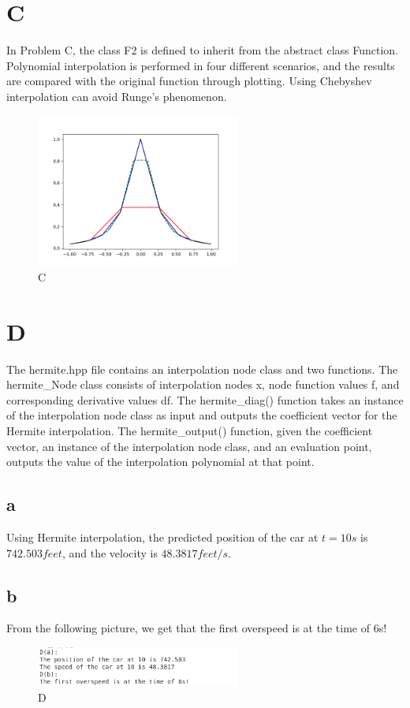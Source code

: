 \documentclass[a4paper]{article}
\begin{document}
\section{C}
In Problem C, the class F2 is defined to inherit from the abstract class Function. Polynomial interpolation is performed in four different scenarios, 
and the results are compared with the original function through plotting. Using Chebyshev interpolation can avoid Runge's phenomenon.
\begin{figure}[htbp]
  \centering
  \includegraphics[width=0.6\textwidth]{pic/C.png}
  \caption{C}
  \label{C}
\end{figure}

\section{D}
The hermite.hpp file contains an interpolation node class and two functions. The hermite{\_}Node class consists of interpolation nodes x, node function values f,
 and corresponding derivative values df. The hermite{\_}diag() function takes an instance of the interpolation node class as input and outputs the coefficient
vector for the Hermite interpolation. The hermite{\_}output() function, given the coefficient vector, an instance of the interpolation node class, and an evaluation point, outputs the value of the interpolation polynomial at that point.

\subsection*{a}
Using Hermite interpolation, the predicted position of the car at $t=10s$ is $742.503 feet$, and the velocity is $48.3817 feet/s$.
\subsection*{b}
From the following picture, we get that the first overspeed is at the time of 6s!
\begin{figure}[htbp]
  \centering
  \includegraphics[width=0.6\textwidth]{pic/D.png}
  \caption{D}
  \label{D}
\end{figure}
\end{document}
